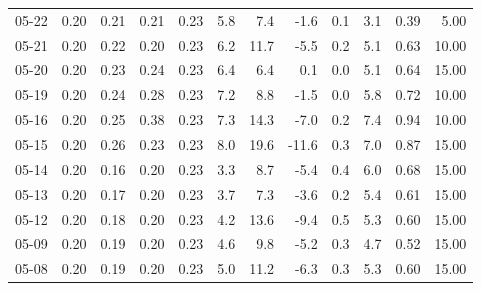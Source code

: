 \begin{threeparttable}
{\begin{tabular}{lrrrrrrrrrrr}
  05-22 &          0.20 &          0.21 &          0.21 &        0.23 &                 5.8 &                 7.4 &       -1.6 &                 0.1 &              3.1 &            0.39 &                   5.00 \\
  05-21 &          0.20 &          0.22 &          0.20 &        0.23 &                 6.2 &                11.7 &       -5.5 &                 0.2 &              5.1 &            0.63 &                  10.00 \\
  05-20 &          0.20 &          0.23 &          0.24 &        0.23 &                 6.4 &                 6.4 &        0.1 &                 0.0 &              5.1 &            0.64 &                  15.00 \\
  05-19 &          0.20 &          0.24 &          0.28 &        0.23 &                 7.2 &                 8.8 &       -1.5 &                 0.0 &              5.8 &            0.72 &                  10.00 \\
  05-16 &          0.20 &          0.25 &          0.38 &        0.23 &                 7.3 &                14.3 &       -7.0 &                 0.2 &              7.4 &            0.94 &                  10.00 \\
  05-15 &          0.20 &          0.26 &          0.23 &        0.23 &                 8.0 &                19.6 &      -11.6 &                 0.3 &              7.0 &            0.87 &                  15.00 \\
  05-14 &          0.20 &          0.16 &          0.20 &        0.23 &                 3.3 &                 8.7 &       -5.4 &                 0.4 &              6.0 &            0.68 &                  15.00 \\
  05-13 &          0.20 &          0.17 &          0.20 &        0.23 &                 3.7 &                 7.3 &       -3.6 &                 0.2 &              5.4 &            0.61 &                  15.00 \\
  05-12 &          0.20 &          0.18 &          0.20 &        0.23 &                 4.2 &                13.6 &       -9.4 &                 0.5 &              5.3 &            0.60 &                  15.00 \\
  05-09 &          0.20 &          0.19 &          0.20 &        0.23 &                 4.6 &                 9.8 &       -5.2 &                 0.3 &              4.7 &            0.52 &                  15.00 \\
  05-08 &          0.20 &          0.19 &          0.20 &        0.23 &                 5.0 &                11.2 &       -6.3 &                 0.3 &              5.3 &            0.60 &                  15.00 \\

\end{tabular}}
\end{threeparttable}
